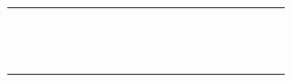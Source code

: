 ﻿\documentclass[12pt]{article}
\begin{document}
\begin{tabular}{|l|p{3.5cm}|p{3.5cm}|p{3.5cm}|p{1.5cm}|p{1.5cm}|l|l|l|l|l|l|l|l|l|l|l|l|l|}
 &  &  &  &  &  & & & & & & & & & & & &  \\ \hline
 &  &  &  &  &  & & & & & & & & & & & &  \\ \hline
 &  &  &  &  &  & & & & & & & & & & & &  \\ \hline
 &  &  &  &  &  & & & & & & & & & & & &  \\ \hline
 &  &  &  &  &  & & & & & & & & & & & &  \\ \hline
 &  &  &  &  &  & & & & & & & & & & & &  \\ \hline
 &  &  &  &  &  & & & & & & & & & & & &  \\ \hline
 &  &  &  &  &  & & & & & & & & & & & &  \\ \hline
 &  &  &  &  &  & & & & & & & & & & & &  \\ \hline
 &  &  &  &  &  & & & & & & & & & & & &  \\ \hline
 &  &  &  &  &  & & & & & & & & & & & &  \\ \hline
 &  &  &  &  &  & & & & & & & & & & & &  \\ \hline
 &  &  &  &  &  & & & & & & & & & & & &  \\ \hline

\end{tabular}

\pagebreak

\end{document}
